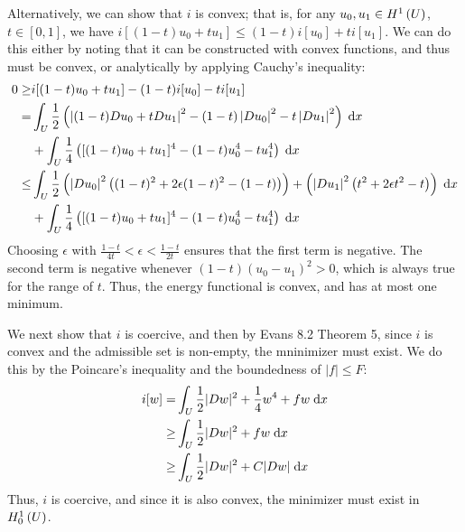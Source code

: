 Alternatively, we can show that $i$ is convex; that is, for any $u_0, u_1 \in H^{1}\left(U \right)$,
$t \in [0, 1]$, we have $i[(1 - t) u_0 + t u_1] \leq (1 - t) i[u_0] + t i[u_1]$.
We can do this either by noting that it can be constructed with convex functions,
and thus must be convex, or analytically by applying Cauchy's inequality:
\begin{align*}
 0 \geq &i[(1 - t) u_0 + t u_1] - (1 - t) i[u_0] - t i[u_1]\\
   = &\int_{U} \frac{1}{2} \left(
         \left\lvert (1 - t) D u_0 + t D u_1 \right \rvert^2
           - (1 - t) \left\lvert D u_0 \right\rvert^2
           - t \left\lvert D u_1 \right\rvert^2 \right) \;\mathrm{d}x\\
     &+ \int_{U} \frac{1}{4} \left(
         [(1 - t) u_0 + t u_1]^4
         - (1 - t) u_0^4 - t u_1^4 \right) \;\mathrm{d}x\\
   \leq &\int_{U} \frac{1}{2}
           \left(\left\lvert D u_0 \right\rvert^2 \left( (1 - t)^2 + 2 \epsilon (1 - t)^2 - (1 - t) \right) \right)
           + \left(\left\lvert D u_1 \right\rvert^2 \left( t^2 + 2 \epsilon t^2 - t \right) \right) \;\mathrm{d}x\\
        &+ \int_{U} \frac{1}{4} \left(
          [(1 - t) u_0 + t u_1]^4 - (1 - t) u_0^4 - t u_1^4 \right) \;\mathrm{d}x\\
\end{align*}
Choosing $\epsilon$ with $\frac{1 - t}{4 t} < \epsilon < \frac{1 - t}{2 t}$
ensures that the first term is negative.
The second term is negative whenever $(1 - t) (u_0 - u_1)^2 > 0$, which is always true for the range of $t$.
Thus, the energy functional is convex, and has at most one minimum.

We next show that $i$ is coercive,
and then by Evans 8.2 Theorem 5, since $i$ is convex and the
admissible set is non-empty, the mninimizer must exist.
We do this by the Poincare's inequality and the boundedness of $\lvert f \rvert \leq F$:
\begin{align*}
  i[w] =& \int_{U} \frac{1}{2} \lvert D w \rvert^2 + \frac{1}{4} w^4 + f w \;\mathrm{d}x\\
    \geq& \int_{U} \frac{1}{2} \lvert D w \rvert^2 + f w \;\mathrm{d}x\\
    \geq& \int_{U} \frac{1}{2} \lvert D w \rvert^2 + C \lvert D w \rvert \;\mathrm{d}x
\end{align*}
Thus, $i$ is coercive, and since it is also convex, the minimizer must exist in $H_0^{1}\left(U \right)$.
